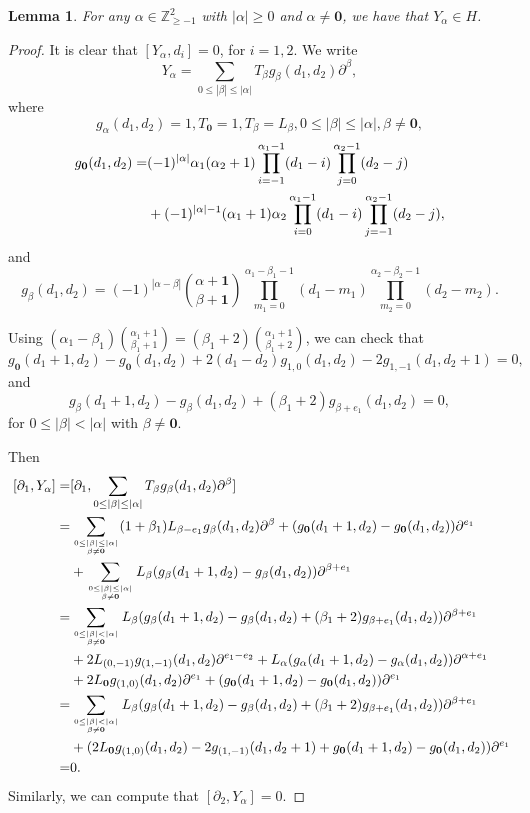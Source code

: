 \documentclass[12pt,a4paper]{amsart}
\newtheorem{Lemma}[Theorem]{Lemma}
\def\Z{\mathbb{Z}}
\def\p{\partial}
\def\a{\alpha}
\def\be{\beta}
\begin{document}
\begin{Lemma}\label{H-generator}For any $\a\in \Z_{\geq-1}^2$ with $|\a|\geq0$ and $\a\neq\mathbf{0}$,  we have that  $Y_{\a}\in H$.
\end{Lemma}
\begin{proof}
It is clear that $[Y_\a,d_i]=0$, for $i=1,2$.
We write
$$Y_\a=\sum_{0\leq|\be|\leq|\a|} T_\be g_\be(d_1,d_2)\p^{\be},$$ where
$$g_\a(d_1,d_2)=1,T_\mathbf{0}=1,T_\be=L_\be,0\leq|\be|\leq|\a|,\be\neq\mathbf{0},$$
$$ \aligned g_\mathbf{0}(d_1,d_2)=&(-1)^{|\a|}\a_1(\a_2+1)\prod_{i=-1}^{\a_1-1}(d_1-i)
\prod_{j=0}^{\a_2-1}(d_2-j)\\
&+(-1)^{|\a|-1}(\a_1+1)\a_2\prod_{i=0}^{\a_1-1}(d_1-i)\prod_{j=-1}^{\a_2-1}(d_2-j), \endaligned$$
and $$g_\be(d_1,d_2)=(-1)^{|\a-\be|}
\binom{\a+\mathbf{1}}{\be+\mathbf{1}}
\prod_{m_1=0}^{\a_1-\be_1-1}(d_1-m_1)
\prod_{m_2=0}^{\a_2-\be_2-1}(d_2-m_2).$$

Using $(\a_1-\be_1)\binom{\a_1+1}{\be_1+1}=(\be_1+2)\binom{\a_1+1}{\be_1+2}$, we can check that
 $$g_{\mathbf{0}}(d_1+1,d_2)-g_{\mathbf{0}}(d_1,d_2)
 +2(d_1-d_2)g_{1,0}(d_1,d_2)-2g_{1,-1}(d_1,d_2+1)=0, $$
and $$g_{\be}(d_1+1,d_2)-g_{\be}(d_1,d_2)+(\be_1+2)g_{\be+e_1}(d_1,d_2)=0,$$ for $0\leq|\be|<|\a|$ with $\be\neq\mathbf{0}$.

Then
$$\aligned \
[\p_1,Y_{\a}]=&[\p_1,\sum_{0\leq|\be|\leq|\a|} T_\be g_\be(d_1,d_2)\p^{\be}]\\
=&\sum_{0\leq|\be|\leq|\a|\atop \be\neq\mathbf{0}}(1+\be_1)L_{\be-e_1} g_\be(d_1,d_2)\p^{\be}
+(g_\mathbf{0}(d_1+1,d_2)-g_\mathbf{0}(d_1,d_2))\p^{e_1}\\
&+\sum_{0\leq |\be| \leq |\a|\atop \be\neq\mathbf{0}} L_\be(g_\be(d_1+1,d_2)-g_\be(d_1,d_2))\p^{\be+e_1}\\
=&\sum_{0\leq|\be|<|\a|\atop \be\neq\mathbf{0}}L_\be(g_{\be}(d_1+1,d_2)-g_{\be}(d_1,d_2)
+(\be_1+2)g_{\be+e_1}(d_1,d_2))\p^{\be+e_1}\\
&+2L_{(0,-1)}g_{(1,-1)}(d_1,d_2)\p^{e_1-e_2}+L_\a(g_\a(d_1+1,d_2)-g_\a(d_1,d_2))\p^{\a+e_1}\\
&+2L_{\mathbf{0}} g_{(1,0)}(d_1,d_2)\p^{e_1}
+(g_\mathbf{0}(d_1+1,d_2)-g_\mathbf{0}(d_1,d_2))\p^{e_1}\\
=&\sum_{0\leq|\be|<|\a|\atop \be\neq\mathbf{0}}L_\be(g_{\be}(d_1+1,d_2)-g_{\be}(d_1,d_2)
+(\be_1+2)g_{\be+e_1}(d_1,d_2))\p^{\be+e_1}\\
&+(2L_{\mathbf{0}} g_{(1,0)}(d_1,d_2)-2g_{(1,-1)}(d_1,d_2+1)
+g_\mathbf{0}(d_1+1,d_2)-g_\mathbf{0}(d_1,d_2))\p^{e_1}\\
=&0.
\endaligned$$
Similarly, we can compute that $[\p_2,Y_\a]=0$.
\end{proof}
\end{document}
